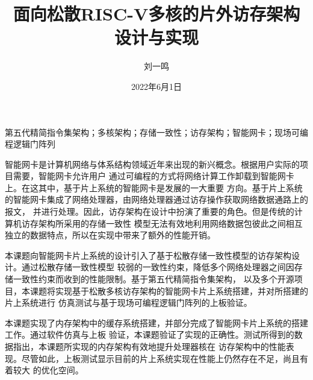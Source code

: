 \documentclass[supercite,gbt15cite,notofont]{HustGraduPaper}
\title{面向松散RISC-V多核的片外访存架构设计与实现}
\author{刘一鸣}
\date{2022年6月1日}
\begin{document}
\maketitle

\statement

\clearpage


\begin{cnabstract}{第五代精简指令集架构；多核架构；存储一致性；访存架构；智能网卡；现场可编程逻辑门阵列}

智能网卡是计算机网络与体系结构领域近年来出现的新兴概念。根据用户实际的项目需要，智能网卡允许用户
通过可编程的方式将网络计算工作卸载到智能网卡上。在这其中，基于片上系统的智能网卡是发展的一大重要
方向。基于片上系统的智能网卡集成了网络处理器，由网络处理器通过访存操作获取网络数据通路上的报文，
并进行处理。因此，访存架构在设计中扮演了重要的角色。但是传统的计算机访存架构所采用的存储一致性
模型无法有效地利用网络数据包彼此之间相互独立的数据特点，所以在实现中带来了额外的性能开销。

本课题向智能网卡片上系统的设计引入了基于松散存储一致性模型的访存架构设计。通过松散存储一致性模型
较弱的一致性约束，降低多个网络处理器之间因存储一致性约束而收到的性能限制。基于第五代精简指令集架构，
以及多个开源项目，本课题将实现基于松散多核访存架构的智能网卡片上系统搭建，并对所搭建的片上系统进行
仿真测试与基于现场可编程逻辑门阵列的上板验证。

本课题实现了内存架构中的缓存系统搭建，并部分完成了智能网卡片上系统的搭建工作。通过软件仿真与上板
验证，本课题验证了实现的正确性。测试所得到的数据指出，本课题所实现的内存架构有效地提升处理器核在
访存架构中的性能表现。尽管如此，上板测试显示目前的片上系统实现在性能上仍然存在不足，尚且有着较大
的优化空间。

\end{cnabstract}
\end{document}
